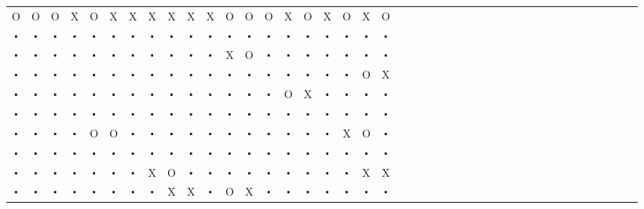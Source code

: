 \documentclass[fontscale=0.38]{baposter}
\begin{document}
\begin{poster}
{{    %
    \begin{center} \tiny \setlength{\tabcolsep}{0pt} \begin{tabular}{cccccccccccccccccccccccccccccccccccccccccc}
    O&O&O&X&O&X&X&X&X&X&X&O&O&O&X&O&X&O&X&O\\
    $\centerdot$&$\centerdot$&$\centerdot$&$\centerdot$&$\centerdot$&$\centerdot$&$\centerdot$&$\centerdot$&$\centerdot$&$\centerdot$&$\centerdot$&$\centerdot$&$\centerdot$&$\centerdot$&$\centerdot$&$\centerdot$&$\centerdot$&$\centerdot$&$\centerdot$&$\centerdot$\\
    $\centerdot$&$\centerdot$&$\centerdot$&$\centerdot$&$\centerdot$&$\centerdot$&$\centerdot$&$\centerdot$&$\centerdot$&$\centerdot$&$\centerdot$&X&O&$\centerdot$&$\centerdot$&$\centerdot$&$\centerdot$&$\centerdot$&$\centerdot$&$\centerdot$\\
    $\centerdot$&$\centerdot$&$\centerdot$&$\centerdot$&$\centerdot$&$\centerdot$&$\centerdot$&$\centerdot$&$\centerdot$&$\centerdot$&$\centerdot$&$\centerdot$&$\centerdot$&$\centerdot$&$\centerdot$&$\centerdot$&$\centerdot$&$\centerdot$&O&X\\
    $\centerdot$&$\centerdot$&$\centerdot$&$\centerdot$&$\centerdot$&$\centerdot$&$\centerdot$&$\centerdot$&$\centerdot$&$\centerdot$&$\centerdot$&$\centerdot$&$\centerdot$&$\centerdot$&O&X&$\centerdot$&$\centerdot$&$\centerdot$&$\centerdot$\\
    $\centerdot$&$\centerdot$&$\centerdot$&$\centerdot$&$\centerdot$&$\centerdot$&$\centerdot$&$\centerdot$&$\centerdot$&$\centerdot$&$\centerdot$&$\centerdot$&$\centerdot$&$\centerdot$&$\centerdot$&$\centerdot$&$\centerdot$&$\centerdot$&$\centerdot$&$\centerdot$\\
    $\centerdot$&$\centerdot$&$\centerdot$&$\centerdot$&O&O&$\centerdot$&$\centerdot$&$\centerdot$&$\centerdot$&$\centerdot$&$\centerdot$&$\centerdot$&$\centerdot$&$\centerdot$&$\centerdot$&$\centerdot$&X&O&$\centerdot$\\
    $\centerdot$&$\centerdot$&$\centerdot$&$\centerdot$&$\centerdot$&$\centerdot$&$\centerdot$&$\centerdot$&$\centerdot$&$\centerdot$&$\centerdot$&$\centerdot$&$\centerdot$&$\centerdot$&$\centerdot$&$\centerdot$&$\centerdot$&$\centerdot$&$\centerdot$&$\centerdot$\\
    $\centerdot$&$\centerdot$&$\centerdot$&$\centerdot$&$\centerdot$&$\centerdot$&$\centerdot$&X&O&$\centerdot$&$\centerdot$&$\centerdot$&$\centerdot$&$\centerdot$&$\centerdot$&$\centerdot$&$\centerdot$&$\centerdot$&X&X\\
    $\centerdot$&$\centerdot$&$\centerdot$&$\centerdot$&$\centerdot$&$\centerdot$&$\centerdot$&$\centerdot$&X&X&$\centerdot$&O&X&$\centerdot$&$\centerdot$&$\centerdot$&$\centerdot$&$\centerdot$&$\centerdot$&$\centerdot$\\

\end{tabular}
\end{center}}}
\end{poster}
\end{document}
